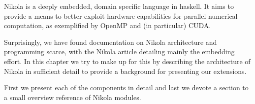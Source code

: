 
Nikola is a deeply embedded, domain specific language in haskell. It aims to
provide a means to better exploit hardware capabilities for parallel numerical
computation, as exemplified by OpenMP and (in particular) CUDA.

Surprisingly, we have found documentation on Nikola architecture and
programming scarce, with the Nikola article \cite{mainland2010nikola}
detailing mainly the embedding effort. In this chapter we try to make up for
this by describing the architecture of Nikola in sufficient detail to provide a
background for presenting our extensions.

First we present each of the components in detail and last we devote a section
to a small overview reference of Nikola modules.
